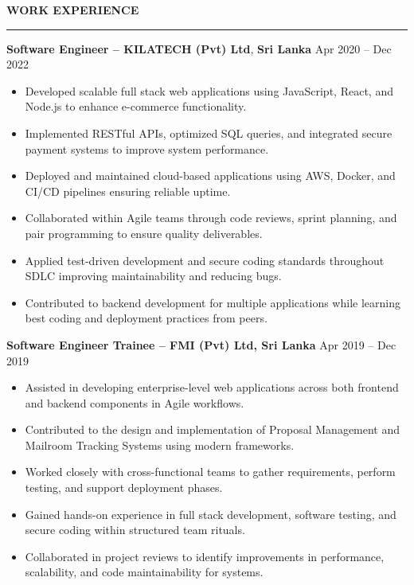 \documentclass[10pt,letterpaper]{article}
\begin{document}
\vspace{8pt}

\textbf{WORK EXPERIENCE}\\[-8pt]
\noindent\rule{\textwidth}{1pt}

\vspace{-2pt}

\textbf{Software Engineer -- KILATECH (Pvt) Ltd}, \textbf{Sri Lanka} \hfill Apr 2020 -- Dec 2022

\vspace{-1pt}

\begin{itemize}
\item Developed scalable full stack web applications using JavaScript, React, and Node.js to enhance e-commerce functionality.
\item Implemented RESTful APIs, optimized SQL queries, and integrated secure payment systems to improve system performance.
\item Deployed and maintained cloud-based applications using AWS, Docker, and CI/CD pipelines ensuring reliable uptime.
\item Collaborated within Agile teams through code reviews, sprint planning, and pair programming to ensure quality deliverables.
\item Applied test-driven development and secure coding standards throughout SDLC improving maintainability and reducing bugs.
\item Contributed to backend development for multiple applications while learning best coding and deployment practices from peers.
\end{itemize}

\textbf{Software Engineer Trainee -- FMI (Pvt) Ltd, Sri Lanka} \hfill Apr 2019 -- Dec 2019

\vspace{-1pt}

\begin{itemize}
\item Assisted in developing enterprise-level web applications across both frontend and backend components in Agile workflows.
\item Contributed to the design and implementation of Proposal Management and Mailroom Tracking Systems using modern frameworks.
\item Worked closely with cross-functional teams to gather requirements, perform testing, and support deployment phases.
\item Gained hands-on experience in full stack development, software testing, and secure coding within structured team rituals.
\item Collaborated in project reviews to identify improvements in performance, scalability, and code maintainability for systems.
\end{itemize}
\end{document}

